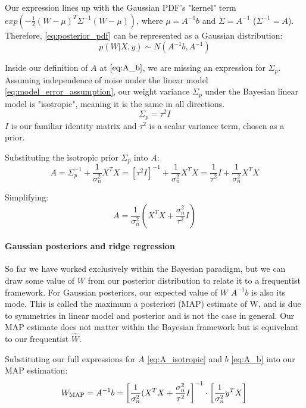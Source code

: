 Our expression lines up with the Gaussian PDF's "kernel" term $exp\left(-\frac{1}{2}(W - \mu)^T\Sigma^{-1}(W - \mu)\right)$, where $\mu = A^{-1}b$ and $\Sigma = A^{-1}$ ($\Sigma^{-1} = A$). Therefore, \ref{eq:posterior_pdf} can be represented as a Gaussian distribution:
\begin{equation} \label{eq:posterior_gaussian}
    p(W|X,y) \sim N(A^{-1}b, A^{-1})
\end{equation}

Inside our definition of $A$ at $\ref{eq:A_b}$, we are missing an expression for $\Sigma_p$. Assuming independence of noise under the linear model \ref{eq:model_error_assumption}, our weight variance $\Sigma_p$ under the Bayesian linear model is "isotropic", meaning it is the same in all directions.
\begin{equation*}
    \Sigma_p = \tau^2 I
\end{equation*}
$I$ is our familiar identity matrix and $\tau^2$ is a scalar variance term, chosen as a prior.

Substituting the isotropic prior $\Sigma_p$ into $A$:
\begin{equation*}
    A = \Sigma_p^{-1} + \frac{1}{\sigma^2_n}X^TX = \left[{\tau^2}I\right]^{-1} + \frac{1}{\sigma^2_n}X^TX =  \frac{1}{\tau^2}I + \frac{1}{\sigma^2_n}X^TX
\end{equation*}

Simplifying:
\begin{equation} \label{eq:A_isotropic}
A = \frac{1}{\sigma_n^2}\left(X^TX + \frac{\sigma_n^2}{\tau^2}I\right)
\end{equation}

\paragraph{Gaussian posteriors and ridge regression}
So far we have worked exclusively within the Bayesian paradigm, but we can draw some value of $W$ from our posterior distribution to relate it to a frequentist framework. For Gaussian posteriors, our expected value of $W$ $A^{-1}b$ is also its mode. This is called the maximum a posteriori (MAP) estimate of W, and is due to symmetries in linear model and posterior and is not the case in general.  Our MAP estimate does not matter within the Bayesian framework but is equivelant to our frequentist $\hat{W}$.

Substituting our full expressions for $A$ \ref{eq:A_isotropic} and $b$ \ref{eq:A_b} into our MAP estimation:
\begin{equation*} 
    W_{\text{MAP}} = A^{-1}b = \left[\frac{1}{\sigma_n^2}(X^TX + \frac{\sigma_n^2}{\tau^2}I\right]^{-1} \cdot \left[\frac{1}{\sigma_n^2}y^TX\right] \\
\end{equation*}

